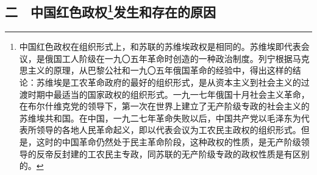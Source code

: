 \documentclass[cn,11pt,chinese]{elegantbook}
\def\myformat#1{\hfil\hfil #1}
\begin{document}
\subsection*{\myformat{二　中国红色政权\footnote[6]{ 中国红色政权在组织形式上，和苏联的苏维埃政权是相同的。苏维埃即代表会议，是俄国工人阶级在一九〇五年革命时创造的一种政治制度。列宁根据马克思主义的原理，从巴黎公社和一九〇五年俄国革命的经验中，得出这样的结论：苏维埃是工农革命政府的最好的组织形式，是从资本主义到社会主义的过渡时期中最适当的国家政权的组织形式。一九一七年俄国十月社会主义革命，在布尔什维克党的领导下，第一次在世界上建立了无产阶级专政的社会主义的苏维埃共和国。在中国，一九二七年革命失败以后，中国共产党以毛泽东为代表所领导的各地人民革命起义，即以代表会议为工农民主政权的组织形式。但是，这时的中国革命仍然处于民主革命阶段，这种政权的性质，是无产阶级领导的反帝反封建的工农民主专政，同苏联的无产阶级专政的政权性质是有区别的。}发生和存在的原因}}
\end{document}
